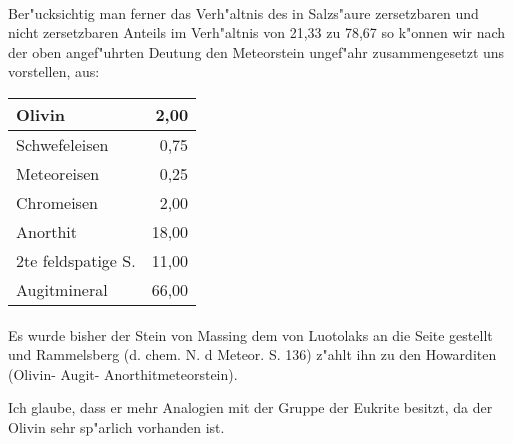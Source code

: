 \documentclass[a4paper, 11pt, oneside]{article}
\begin{document}
\paragraph{}
Ber"ucksichtig man ferner das Verh"altnis des in Salzs"aure zersetzbaren und nicht zersetzbaren Anteils im Verh"altnis von 21,33 zu 78,67 so k"onnen wir nach der oben angef"uhrten Deutung den Meteorstein ungef"ahr zusammengesetzt uns vorstellen, aus:
\begin{center}
    \begin{tabular}{ |l|r| } 
    \hline
    Olivin & 2,00\\\hline
    Schwefeleisen & 0,75\\\hline
    Meteoreisen & 0,25\\\hline
    Chromeisen & 2,00\\\hline
    Anorthit & 18,00\\\hline
    2te feldspatige S. & 11,00\\\hline
    Augitmineral & 66,00\\
    \hline
    \end{tabular}
\end{center}
\paragraph{}
Es wurde bisher der Stein von Massing dem von Luotolaks an die Seite gestellt und Rammelsberg (d. chem. N. d Meteor. S. 136) z"ahlt ihn zu den Howarditen (Olivin- Augit- Anorthitmeteorstein).

Ich glaube, dass er mehr Analogien mit der Gruppe der Eukrite besitzt, da der Olivin sehr sp"arlich vorhanden ist.
\end{document}
